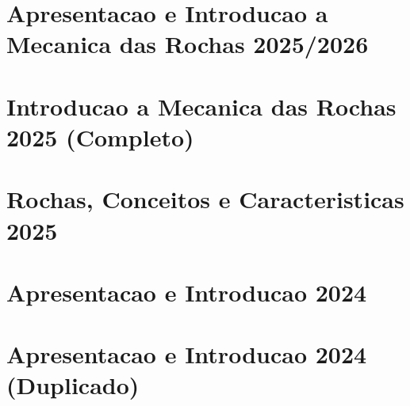 \documentclass[12pt,a4paper,twoside]{book}
\begin{document}
\section{Apresentacao e Introducao a Mecanica das Rochas 2025/2026}



\section{Introducao a Mecanica das Rochas 2025 (Completo)}



\section{Rochas, Conceitos e Caracteristicas 2025}



\section{Apresentacao e Introducao 2024}



\section{Apresentacao e Introducao 2024 (Duplicado)}


\end{document}
